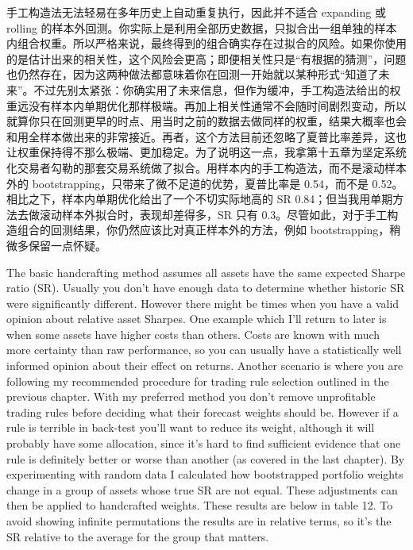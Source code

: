 \begin{chineseblock}手工构造法无法轻易在多年历史上自动重复执行，因此并不适合 expanding 或 rolling 的样本外回测。你实际上是利用全部历史数据，只拟合出一组单独的样本内组合权重。所以严格来说，最终得到的组合确实存在过拟合的风险。如果你使用的是估计出来的相关性，这个风险会更高；即便相关性只是“有根据的猜测”，问题也仍然存在，因为这两种做法都意味着你在回测一开始就以某种形式“知道了未来”。不过先别太紧张：你确实用了未来信息，但作为缓冲，手工构造法给出的权重远没有样本内单期优化那样极端。再加上相关性通常不会随时间剧烈变动，所以就算你只在回测更早的时点、用当时之前的数据去做同样的权重，结果大概率也会和用全样本做出来的非常接近。再者，这个方法目前还忽略了夏普比率差异，这也让权重保持得不那么极端、更加稳定。为了说明这一点，我拿第十五章为坚定系统化交易者勾勒的那套交易系统做了拟合。用样本内的手工构造法，而不是滚动样本外的 bootstrapping，只带来了微不足道的优势，夏普比率是 0.54，而不是 0.52。相比之下，样本内单期优化给出了一个不切实际地高的 SR 0.84；但当我用单期方法去做滚动样本外拟合时，表现却差得多，SR 只有 0.3。尽管如此，对于手工构造组合的回测结果，你仍然应该比对真正样本外的方法，例如 bootstrapping，稍微多保留一点怀疑。\end{chineseblock}


\begin{englishblock} The basic handcrafting method assumes all assets have the same expected Sharpe ratio (SR). Usually you don't have enough data to determine whether historic SR were significantly different. However there might be times when you have a valid opinion about relative asset Sharpes. One example which I'll return to later is when some assets have higher costs than others. Costs are known with much more certainty than raw performance, so you can usually have a statistically well informed opinion about their effect on returns. Another scenario is where you are following my recommended procedure for trading rule selection outlined in the previous chapter. With my preferred method you don't remove unprofitable trading rules before deciding what their forecast weights should be. However if a rule is terrible in back-test you'll want to reduce its weight, although it will probably have some allocation, since it's hard to find sufficient evidence that one rule is definitely better or worse than another (as covered in the last chapter). By experimenting with random data I calculated how bootstrapped portfolio weights change in a group of assets whose true SR are not equal. These adjustments can then be applied to handcrafted weights. These results are below in table 12. To avoid showing infinite permutations the results are in relative terms, so it's the SR relative to the average for the group that matters. \end{englishblock}

